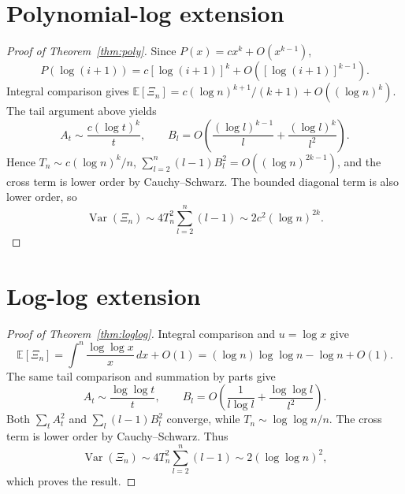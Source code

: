\documentclass[11pt]{article}
\begin{document}
\section{Polynomial-log extension}
\begin{proof}[Proof of Theorem~\ref{thm:poly}]
Since $P(x)=cx^k+O(x^{k-1})$,
\[
P(\log(i+1))=c[\log(i+1)]^k+O([\log(i+1)]^{k-1}).
\]
Integral comparison gives
$\mathbb E[\Xi_n]=c(\log n)^{k+1}/(k+1)+O((\log n)^k)$.
The tail argument above yields
\[
A_t\sim\frac{c(\log t)^k}{t},\qquad
B_l=O\left(\frac{(\log l)^{k-1}}{l}+\frac{(\log l)^k}{l^2}\right).
\]
Hence $T_n\sim c(\log n)^k/n$,
$\sum_{l=2}^n(l-1)B_l^2=O((\log n)^{2k-1})$, and the cross term is lower
order by Cauchy--Schwarz.  The bounded diagonal term is also lower order, so
\[
\operatorname{Var}(\Xi_n)
\sim4T_n^2\sum_{l=2}^n(l-1)\sim2c^2(\log n)^{2k}.
\]
\end{proof}

\section{Log-log extension}
\begin{proof}[Proof of Theorem~\ref{thm:loglog}]
Integral comparison and $u=\log x$ give
\[
\mathbb E[\Xi_n]
=\int^n\frac{\log\log x}{x}\,dx+O(1)
=(\log n)\log\log n-\log n+O(1).
\]
The same tail comparison and summation by parts give
\[
A_t\sim\frac{\log\log t}{t},\qquad
B_l=O\left(\frac1{l\log l}+\frac{\log\log l}{l^2}\right).
\]
Both $\sum_tA_t^2$ and $\sum_l(l-1)B_l^2$ converge, while
$T_n\sim\log\log n/n$.  The cross term is lower order by Cauchy--Schwarz.
Thus
\[
\operatorname{Var}(\Xi_n)
\sim4T_n^2\sum_{l=2}^n(l-1)\sim2(\log\log n)^2,
\]
which proves the result.
\end{proof}
\end{document}
